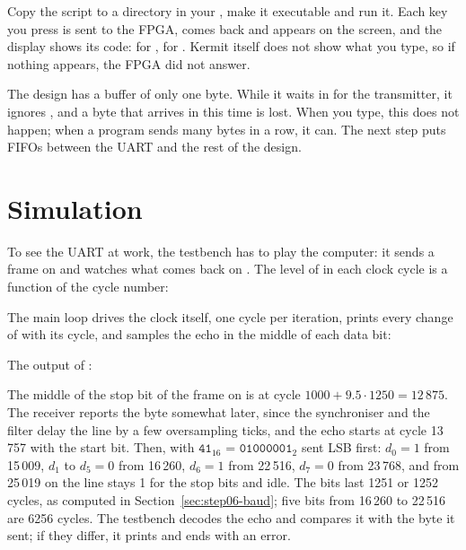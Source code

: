 Copy the script to a directory in your , make it executable and run
it. Each key you press is sent to the FPGA, comes back and appears on the
screen, and the display shows its code:  for ,  for
. Kermit itself does not show what you type, so if nothing appears,
the FPGA did not answer.

The design has a buffer of only one byte. While it waits in
 for the transmitter, it ignores , and a
byte that arrives in this time is lost. When you type, this does not happen;
when a program sends many bytes in a row, it can. The next step puts FIFOs
between the UART and the rest of the design.

\section{Simulation}
\label{sec:step06-sim}

To see the UART at work, the testbench has to play the computer: it sends a
frame on  and watches what comes back on . The level of
 in each clock cycle is a function of the cycle number:


The main loop drives the clock itself, one cycle per iteration, prints every
change of  with its cycle, and samples the echo in the middle of each
data bit:


The output of :


The middle of the stop bit of the frame on  is at cycle
$1000 + 9.5 \cdot 1250 = 12\,875$. The receiver reports the byte somewhat
later, since the synchroniser and the filter delay the line by a few
oversampling ticks, and the echo starts at cycle 13\,757 with the start bit.
Then, with $\mathtt{41}_{16}$ = $\mathtt{01000001}_2$ sent LSB first: $d_0 =
1$ from 15\,009, $d_1$ to $d_5 = 0$ from 16\,260, $d_6 = 1$ from 22\,516, $d_7
= 0$ from 23\,768, and from 25\,019 on the line stays 1 for the stop bits and
idle. The bits last 1251 or 1252 cycles, as computed in
Section~\ref{sec:step06-baud}; five bits from 16\,260 to 22\,516 are 6256
cycles. The testbench decodes the echo and compares it with the byte it sent;
if they differ, it prints  and  ends with an error.

